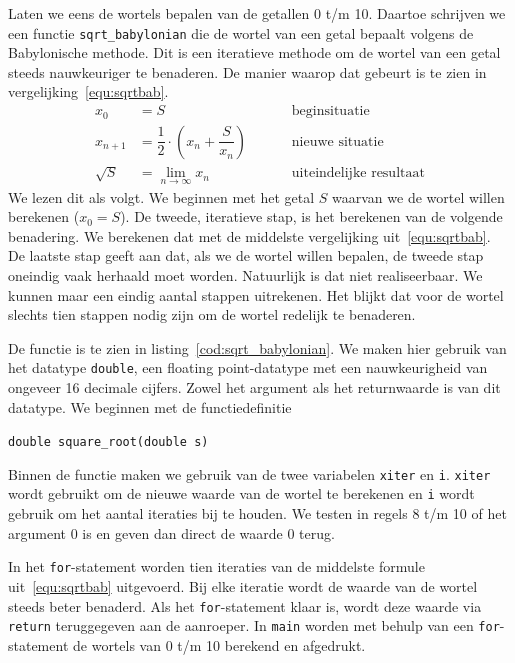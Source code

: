Laten we eens de wortels bepalen van de getallen 0 t/m 10. Daartoe schrijven we een functie \texttt{sqrt\_babylonian} die de wortel van een getal bepaalt volgens de Babylonische methode. Dit is een iteratieve methode om de wortel van een getal steeds nauwkeuriger te benaderen. De manier waarop dat gebeurt is te zien in vergelijking~\eqref{equ:sqrtbab}.
%
\begin{equation}
\label{equ:sqrtbab}
\begin{split}
x_0 &= S &&&& \text{beginsituatie} \\
x_{n+1} &= \dfrac{1}{2}\cdot\left(x_n + \dfrac{S}{x_n}\right) &&&& \text{nieuwe situatie}\\
\sqrt{S} &= \lim_{n\rightarrow\infty} x_n &&&& \text{uiteindelijke resultaat}
\end{split}
\end{equation}
%
We lezen dit als volgt. We beginnen met het getal $S$ waarvan we de wortel willen berekenen ($x_0= S$). De tweede, iteratieve stap, is het berekenen van de volgende benadering. We berekenen dat met de middelste vergelijking uit~\eqref{equ:sqrtbab}. De laatste stap geeft aan dat, als we de wortel willen bepalen, de tweede stap oneindig vaak herhaald moet worden. Natuurlijk is dat niet realiseerbaar. We kunnen maar een eindig aantal stappen uitrekenen. Het blijkt dat voor de wortel slechts tien stappen nodig zijn om de wortel redelijk te benaderen.

De functie is te zien in listing~\ref{cod:sqrt_babylonian}. We maken hier gebruik van het datatype \texttt{double}, een floating point-datatype met een nauwkeurigheid van ongeveer 16 decimale cijfers. Zowel het argument als het returnwaarde is van dit datatype. We beginnen met de functiedefinitie

\hspace*{1em}\texttt{double square\_root(double s)}

Binnen de functie maken we gebruik van de twee variabelen \texttt{xiter} en \texttt{i}. \texttt{xiter} wordt gebruikt om de nieuwe waarde van de wortel te berekenen en \texttt{i} wordt gebruik om het aantal iteraties bij te houden.
We testen in regels 8 t/m 10 of het argument 0 is en geven dan direct de waarde 0 terug.


In het \texttt{for}-statement worden tien iteraties van de middelste formule uit~\eqref{equ:sqrtbab} uitgevoerd. Bij elke iteratie wordt de waarde van de wortel steeds beter benaderd. Als het \texttt{for}-statement klaar is, wordt deze waarde via \texttt{return} teruggegeven aan de aanroeper. In \texttt{main} worden met behulp van een \texttt{for}-statement de wortels van 0 t/m 10 berekend en afgedrukt.

